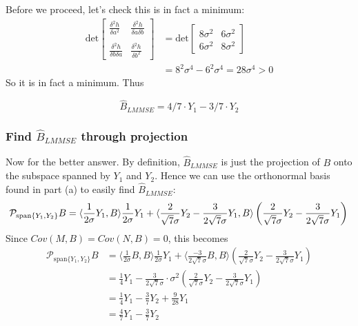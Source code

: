\documentclass[paper=a4, fontsize=11pt]{scrartcl} %
\numberwithin{equation}{section} %
\numberwithin{figure}{section} %
\numberwithin{table}{section} %
\begin{document}
Before we proceed, let's check this is in fact a minimum:
\begin{align*}
\textrm{det} \left[\begin{matrix} \frac{\delta^2 h}{\delta a^2} & \frac{\delta^2 h}{\delta a \delta b} \\ \\
   \frac{\delta^2 h}{\delta b \delta a} & \frac{\delta^2 h}{\delta b^2} \end{matrix} \right]  &= \textrm{det} \left[\begin{matrix} 8 \sigma^2 & 6 \sigma^2 \\
   6 \sigma^2 & 8 \sigma^2 \end{matrix} \right] \\
   &= 8^2 \sigma^4 - 6^2 \sigma^4 = 28 \sigma^4 > 0
\end{align*}
So it is in fact a minimum. Thus

\[\hat{B}_{LMMSE} =4/7 \cdot Y_1 - 3/7 \cdot Y_2\]

\subsubsection{Find $\hat{B}_{LMMSE}$ through projection}

Now for the better answer. By definition, $\hat{B}_{LMMSE}$ is just the projection of $B$ onto the subspace spanned by $Y_1$ and $Y_2$. Hence we can use the orthonormal basis found in part (a) to easily find $\hat{B}_{LMMSE}$:
\[
\mathcal{P}_{\textrm{span}\{Y_1,Y_2\}} B = \langle \frac{1}{2\sigma}Y_1, B \rangle \frac{1}{2\sigma}Y_1 + \langle  \frac{2}{\sqrt{7}\sigma} Y_2 - \frac{3}{2\sqrt{7}\sigma}Y_1, B \rangle \left(\frac{2}{\sqrt{7}\sigma} Y_2 - \frac{3}{2\sqrt{7}\sigma}Y_1\right) \\
 \]
 Since $Cov(M,B) = Cov(N,B) = 0$, this becomes
\begin{align*}
\mathcal{P}_{\textrm{span}\{Y_1,Y_2\}} B &= \langle \frac{1}{2\sigma}B, B \rangle \frac{1}{2\sigma}Y_1 + \langle  \frac{-3}{2\sqrt{7}\sigma} B, B \rangle \left(\frac{2}{\sqrt{7}\sigma} Y_2 - \frac{3}{2\sqrt{7}\sigma}Y_1\right) \\
   &= \frac{1}{4} Y_1 - \frac{3}{2 \sqrt{7}\sigma} \cdot \sigma^2 \left(\frac{2}{\sqrt{7}\sigma} Y_2 - \frac{3}{2\sqrt{7}\sigma}Y_1\right) \\
   &= \frac{1}{4} Y_1 - \frac{3}{7} Y_2 + \frac{9}{28} Y_1 \\
   &= \frac{4}{7} Y_1 - \frac{3}{7} Y_2
\end{align*}
\end{document}
